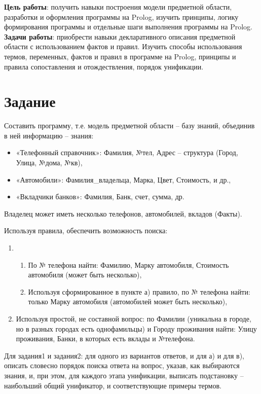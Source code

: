 \documentclass[a4paper,12pt]{article}
\begin{document}
	
	
	
	\textbf{Цель работы}: получить навыки построения модели предметной области, разработки и оформления программы на Prolog, изучить принципы, логику формирования программы и отдельные шаги выполнения программы на Prolog.\\
	
	\textbf{Задачи работы}: приобрести навыки декларативного описания предметной области с использованием фактов и правил.
	Изучить способы использования термов, переменных, фактов и правил в программе на Prolog, принципы  и правила сопоставления и отождествления, порядок унификации.
	
	\section*{Задание}
	
	Составить программу, т.е. модель предметной области – базу знаний, объединив в ней информацию – знания:
	\begin{itemize}
		\item «Телефонный справочник»: Фамилия, №тел, Адрес – структура (Город, Улица, №дома, №кв),
		\item «Автомобили»: Фамилия\_владельца, Марка, Цвет, Стоимость, и др.,
		\item «Вкладчики банков»: Фамилия, Банк, счет, сумма, др.
	\end{itemize}
	
	Владелец может иметь несколько телефонов, автомобилей, вкладов (Факты).
	
	Используя правила, обеспечить возможность поиска:
	\begin{enumerate}
		\item 
		\begin{enumerate}
			\item По № телефона найти: Фамилию, Марку автомобиля, Стоимость автомобиля (может быть несколько),
			\item Используя сформированное в пункте а) правило, по № телефона найти: только Марку автомобиля (автомобилей может быть несколько),
		\end{enumerate}
		\item Используя простой, не составной вопрос: по Фамилии (уникальна в городе, но в разных городах есть однофамильцы) и Городу проживания найти:  Улицу проживания, Банки, в которых есть вклады и №телефона.
	\end{enumerate}
	
	Для задания1 и задания2: 
	для одного из вариантов ответов, и для а) и для в), описать словесно порядок поиска ответа на вопрос, указав, как выбираются знания, и, при этом, для каждого этапа унификации, выписать подстановку – наибольший общий унификатор, и соответствующие примеры термов.
	
\end{document}
